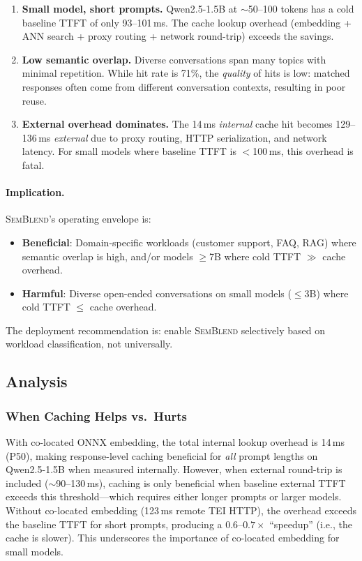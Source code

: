 \documentclass[11pt,twocolumn]{article}
\newcommand{\semblend}{\textsc{SemBlend}\xspace}
\begin{document}
\begin{enumerate}[leftmargin=*,nosep]
\item \textbf{Small model, short prompts.} Qwen2.5-1.5B at
  ${\sim}$50--100 tokens has a cold baseline TTFT of only 93--101\,ms.
  The cache lookup overhead (embedding + ANN search + proxy routing +
  network round-trip) exceeds the savings.

\item \textbf{Low semantic overlap.} Diverse conversations span many
  topics with minimal repetition. While hit rate is 71\%, the
  \emph{quality} of hits is low: matched responses often come from
  different conversation contexts, resulting in poor reuse.

\item \textbf{External overhead dominates.} The 14\,ms \emph{internal}
  cache hit becomes 129--136\,ms \emph{external} due to proxy routing,
  HTTP serialization, and network latency. For small models where
  baseline TTFT is $<$100\,ms, this overhead is fatal.
\end{enumerate}

\paragraph{Implication.} \semblend's operating envelope is:
\begin{itemize}[leftmargin=*,nosep]
\item \textbf{Beneficial}: Domain-specific workloads (customer support,
  FAQ, RAG) where semantic overlap is high, and/or models $\geq$7B where
  cold TTFT $\gg$ cache overhead.
\item \textbf{Harmful}: Diverse open-ended conversations on small models
  ($\leq$3B) where cold TTFT $\leq$ cache overhead.
\end{itemize}
The deployment recommendation is: enable \semblend selectively based on
workload classification, not universally.


\subsection{Analysis}
\label{sec:analysis}

\subsubsection{When Caching Helps vs.\ Hurts}

With co-located ONNX embedding, the total internal lookup overhead is
14\,ms (P50), making response-level caching beneficial for
\emph{all} prompt lengths on Qwen2.5-1.5B when measured internally.
However, when external round-trip is included (${\sim}$90--130\,ms),
caching is only beneficial when baseline external TTFT exceeds this
threshold---which requires either longer prompts or larger models.
Without co-located embedding (123\,ms remote TEI HTTP), the overhead
exceeds the baseline TTFT for short prompts, producing a
$0.6\text{--}0.7\times$ ``speedup'' (i.e., the cache is slower).
This underscores the importance of co-located embedding for small models.
\end{document}
